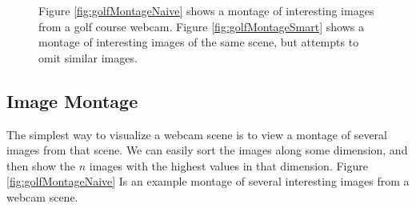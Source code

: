 \begin{figure}
	\centering
		\caption[Image montage techniques.]{Figure \ref{fig:golfMontageNaive} shows a montage of interesting images from a golf course webcam. Figure \ref{fig:golfMontageSmart} shows a montage of interesting images of the same scene, but attempts to omit similar images.}
\end{figure}

\subsection{Image Montage}

The simplest way to visualize a webcam scene is to view a montage of several images from that scene.  We can easily sort the images along some dimension, and then show the $n$ images with the highest values in that dimension.  Figure \ref{fig:golfMontageNaive} Is an example montage of several interesting images from a webcam scene.

